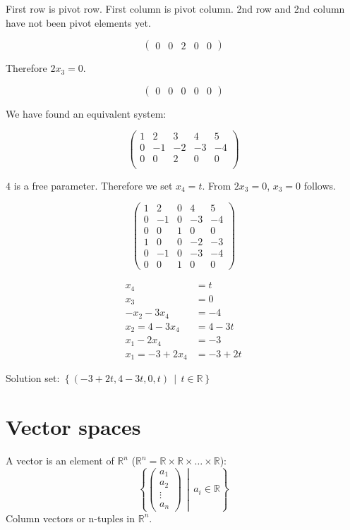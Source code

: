 \documentclass[a4paper,landscape,twocolumn]{article}
\newcommand\setdef[2]{\left\{#1\,\middle|\,#2\right\}}
\begin{document}
First row is pivot row. First column is pivot column.
2nd row and 2nd column have not been pivot elements yet.

\[
  \left(\begin{array}{cccc|c}
    0 &  0 &  2 &  0 &  0
  \end{array}\right)
\]

Therefore $2x_3 = 0$.

\[
  \left(\begin{array}{cccc|c}
     0 &  0 &  0 &  0 &  0
  \end{array}\right)
\]

We have found an equivalent system:

\[
  \left(\begin{array}{cccc|c}
     1 &  2 &  3 &  4 &  5 \\
     0 & -1 & -2 & -3 & -4 \\
     0 &  0 &  2 &  0 &  0 \\
  \end{array}\right)
\]

$4$ is a free parameter. Therefore we set $x_4 = t$.
From $2x_3 = 0$, $x_3 = 0$ follows.

\[
  \left(\begin{array}{cccc|c}
     1 &  2 &  0 &  4 &  5 \\
     0 & -1 &  0 & -3 & -4 \\
     0 &  0 &  1 &  0 &  0 \\
   \hline
     1 &  0 &  0 & -2 & -3 \\
     0 & -1 &  0 & -3 & -4 \\
     0 &  0 &  1 &  0 &  0
  \end{array}\right)
\]

\begin{align*}
  x_4 &= t \\
  x_3 &= 0 \\
  -x_2 - 3x_4 &= -4 \\
  x_2 = 4 - 3x_4 &= 4 - 3t \\
  x_1 - 2x_4 &= -3 \\
  x_1 = -3 + 2x_4 &= -3 + 2t
\end{align*}

Solution set: $\setdef{(-3 + 2t, 4 - 3t, 0, t)}{t \in \mathbb{R}}$

\section{Vector spaces}

A vector is an element of $\mathbb{R}^n$ ($\mathbb{R}^n = \mathbb{R} \times \mathbb{R} \times \ldots \times \mathbb{R}$):
\[ \setdef{\begin{pmatrix} a_1 \\ a_2 \\ \vdots \\ a_n\end{pmatrix}}{a_i \in \mathbb{R}} \]
Column vectors or n-tuples in $\mathbb{R}^n$.
\end{document}
